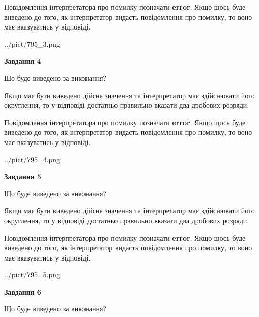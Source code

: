 \documentclass[12pt, ukrainian]{article}
\begin{document}
{\begin {Large}
Повідомлення інтерпретатора про помилку позначати \textbf{error}.
Якщо щось буде виведено до того, як інтерпретатор видасть повідомлення про помилку, 
то воно має вказуватись у відповіді. \par

\begin{center}
	{../pict/795_3.png}
\end{center}
\newpage

{\begin {center}\textbf{Завдання 4}\end {center}}\par
Що буде виведено за виконання? \par

Якщо має бути виведено дійсне значення та інтерпретатор має здійснювати його округлення, 
то у відповіді достатньо правильно вказати два дробових розряди.

Повідомлення інтерпретатора про помилку позначати \textbf{error}.
Якщо щось буде виведено до того, як інтерпретатор видасть повідомлення про помилку, 
то воно має вказуватись у відповіді. \par

\begin{center}
	{../pict/795_4.png}
\end{center}
\newpage

{\begin {center}\textbf{Завдання 5}\end {center}}\par
Що буде виведено за виконання? \par

Якщо має бути виведено дійсне значення та інтерпретатор має здійснювати його округлення, 
то у відповіді достатньо правильно вказати два дробових розряди.

Повідомлення інтерпретатора про помилку позначати \textbf{error}.
Якщо щось буде виведено до того, як інтерпретатор видасть повідомлення про помилку, 
то воно має вказуватись у відповіді. \par

\begin{center}
	{../pict/795_5.png}
\end{center}
\newpage

{\begin {center}\textbf{Завдання 6}\end {center}}\par
Що буде виведено за виконання? \par


\end{Large}}
\end{document}
